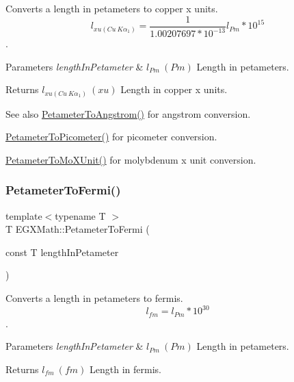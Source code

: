 Converts a length in petameters to copper x units. \[ l_{xu(Cu\ K\alpha_1)}= \frac{1}{1.00207697*10^{-13}} l_{Pm} * 10^{15}\]. 


\begin{DoxyParams}{Parameters}
{\em length\+In\+Petameter} & $ l_{Pm}\ (Pm)$ Length in petameters. \\
\hline
\end{DoxyParams}
\begin{DoxyReturn}{Returns}
$ l_{xu(Cu\ K\alpha_1)}\ (xu)$ Length in copper x units. 
\end{DoxyReturn}
\begin{DoxySeeAlso}{See also}
\mbox{\hyperlink{group___e_g_x_math-_conversions-_length_conversions-_s_i-_petameter-_non-_s_i_ga2acc301b8b78a80d23a150da8cba3814}{Petameter\+To\+Angstrom()}} for angstrom conversion. 

\mbox{\hyperlink{group___e_g_x_math-_conversions-_length_conversions-_s_i-_petameter-_s_i_ga092df775702bdd1b027e20a243d0aa75}{Petameter\+To\+Picometer()}} for picometer conversion. 

\mbox{\hyperlink{group___e_g_x_math-_conversions-_length_conversions-_s_i-_petameter-_non-_s_i_ga29419ba09bb33a7bc9e23f8cde2efea3}{Petameter\+To\+Mo\+X\+Unit()}} for molybdenum x unit conversion. 
\end{DoxySeeAlso}
\mbox{\label{group___e_g_x_math-_conversions-_length_conversions-_s_i-_petameter-_non-_s_i_gaba0fd76c76316722eb49006d032fa493}} 
\subsubsection{\texorpdfstring{Petameter\+To\+Fermi()}{PetameterToFermi()}}
{\footnotesize\ttfamily template$<$typename T $>$ \\
T E\+G\+X\+Math\+::\+Petameter\+To\+Fermi (\begin{DoxyParamCaption}\item[{const T}]{length\+In\+Petameter }\end{DoxyParamCaption})}



Converts a length in petameters to fermis. \[ l_{fm}=l_{Pm} * 10^{30} \]. 


\begin{DoxyParams}{Parameters}
{\em length\+In\+Petameter} & $ l_{Pm}\ (Pm)$ Length in petameters. \\
\hline
\end{DoxyParams}
\begin{DoxyReturn}{Returns}
$ l_{fm}\ (fm)$ Length in fermis. 
\end{DoxyReturn}
\mbox{\label{group___e_g_x_math-_conversions-_length_conversions-_s_i-_petameter-_non-_s_i_gad1c1c26c232339c6304962d20cb29252}} 
